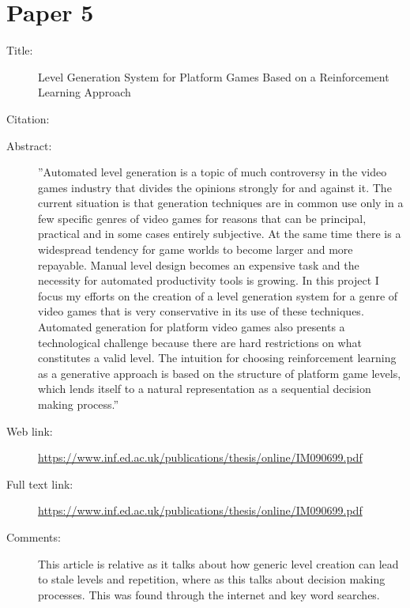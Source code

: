 \documentclass{scrartcl}
\begin{document}
	\section*{Paper 5}
	\begin{description}
		\item[Title:] Level Generation System for Platform Games
		Based on a Reinforcement Learning Approach 
		\item[Citation:] \cite{learning}
		\item[Abstract:]''Automated level generation is a topic of much controversy in the video games
		industry that divides the opinions strongly for and against it. The current situation
		is that generation techniques are in common use only in a few specific genres of
		video games for reasons that can be principal, practical and in some cases entirely
		subjective. At the same time there is a widespread tendency for game worlds to
		become larger and more repayable. Manual level design becomes an expensive
		task and the necessity for automated productivity tools is growing.
		In this project I focus my efforts on the creation of a level generation system for a
		genre of video games that is very conservative in its use of these techniques.
		Automated generation for platform video games also presents a technological
		challenge because there are hard restrictions on what constitutes a valid level.
		The intuition for choosing reinforcement learning as a generative approach is based
		on the structure of platform game levels, which lends itself to a natural
		representation as a sequential decision making process.''
		\item[Web link:]\url{https://www.inf.ed.ac.uk/publications/thesis/online/IM090699.pdf}
		\item[Full text link:] \url{https://www.inf.ed.ac.uk/publications/thesis/online/IM090699.pdf}
		\item[Comments:] This article is relative as it talks about how generic level creation can lead to stale levels and repetition, where as this talks about decision making processes. This was found through the internet and key word searches.
	\end{description}
	
\end{document}
